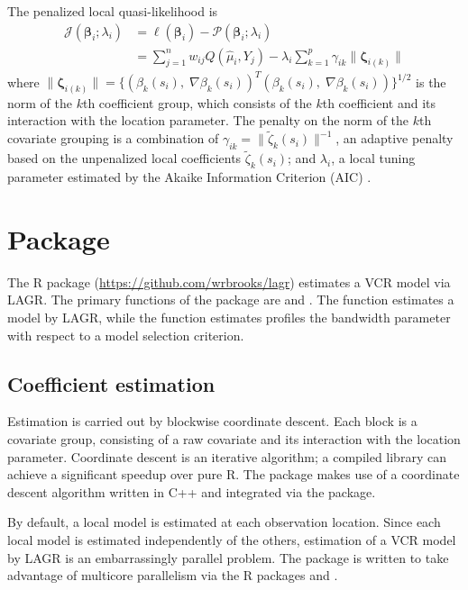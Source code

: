 The penalized local quasi-likelihood is
\begin{align*}
\mathcal{J}(\bm{\beta}_i; \lambda_i) &= \ell(\bm{\beta}_i) - \mathcal{P}(\bm{\beta}_i; \lambda_i) \\
&= \sum_{j=1}^n w_{ij} Q(\hat{\mu}_i, Y_j) - \lambda_i \sum_{k=1}^p \gamma_{ik} \| \bm{\zeta}_{i(k)} \|
\end{align*}
where $\| \bm{\zeta}_{i(k)} \| = \{ \left(\beta_k(s_i), \; \nabla \beta_k(s_i)\right)^T \left(\beta_k(s_i), \; \nabla \beta_k(s_i)\right) \}^{1/2}$ is the norm of the $k$th coefficient group, which consists of the $k$th coefficient and its interaction with the location parameter. The penalty on the norm of the $k$th covariate grouping is a combination of $\gamma_{ik}=\| \tilde{\zeta}_k(s_i) \|^{-1}$, an adaptive penalty based on the unpenalized local coefficients $\tilde{\zeta}_k(s_i)$; and $\lambda_i$, a local tuning parameter estimated by the Akaike Information Criterion (AIC) \citep{Akaike-1973}.


\section{Package}
The R package  (\url{https://github.com/wrbrooks/lagr}) estimates a VCR model via LAGR. The primary functions of the package are  and . The  function estimates a model by LAGR, while the  function estimates profiles the bandwidth parameter with respect to a model selection criterion.

\subsection{Coefficient estimation}
Estimation is carried out by blockwise coordinate descent. Each block is a covariate group, consisting of a raw covariate and its interaction with the location parameter. Coordinate descent is an iterative algorithm; a compiled library can achieve a significant speedup over pure R. The  package makes use of a coordinate descent algorithm written in C++ and integrated via the  package.

By default, a local model is estimated at each observation location. Since each local model is estimated independently of the others, estimation of a VCR model by LAGR is an embarrassingly parallel problem. The package is written to take advantage of multicore parallelism via the R packages  and .

